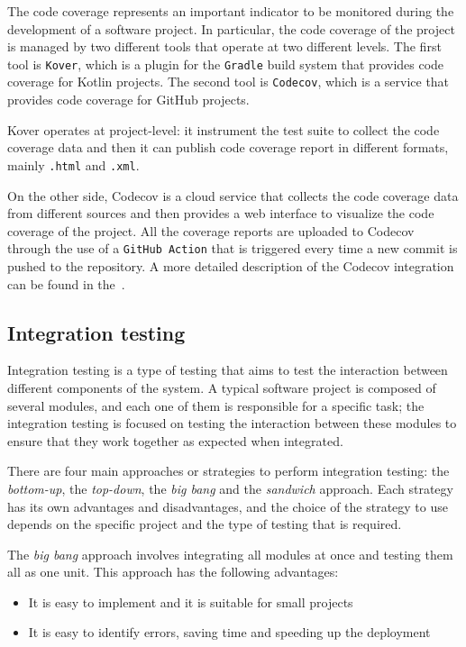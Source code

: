 The code coverage represents an important indicator to be monitored during the development of a software project. In particular, the code coverage
of the project is managed by two different tools that operate at two different levels.
The first tool is \texttt{Kover}, which is a plugin for the \texttt{Gradle} build system that provides code coverage for Kotlin projects.
The second tool is \texttt{Codecov}, which is a service that provides code coverage for GitHub projects.

Kover operates at project-level: it instrument the test suite to collect the code coverage data and then it can publish code coverage report in
different formats, mainly \texttt{.html} and \texttt{.xml}.

On the other side, Codecov is a cloud service that collects the code coverage data from different sources and then provides a web interface
to visualize the code coverage of the project. All the coverage reports are uploaded to Codecov through the use of a \texttt{GitHub Action} that is
triggered every time a new commit is pushed to the repository. A more detailed description of the Codecov integration can be found in
the~.

\subsection{Integration testing}
\label{sec:integration-testing}

Integration testing is a type of testing that aims to test the interaction between different components of the system.
A typical software project is composed of several modules, and each one of them is responsible for a specific task; the integration testing
is focused on testing the interaction between these modules to ensure that they work together as expected when integrated.

There are four main approaches or strategies to perform integration testing: the \emph{bottom-up}, the \emph{top-down}, the \emph{big bang} and
the \emph{sandwich} approach. Each strategy has its own advantages and disadvantages, and the choice of the strategy to use depends on the
specific project and the type of testing that is required.

The \emph{big bang} approach involves integrating all modules at once and testing them all as one unit.
This approach has the following advantages:

\begin{itemize}
	\item It is easy to implement and it is suitable for small projects
	\item It is easy to identify errors, saving time and speeding up the deployment
\end{itemize}

